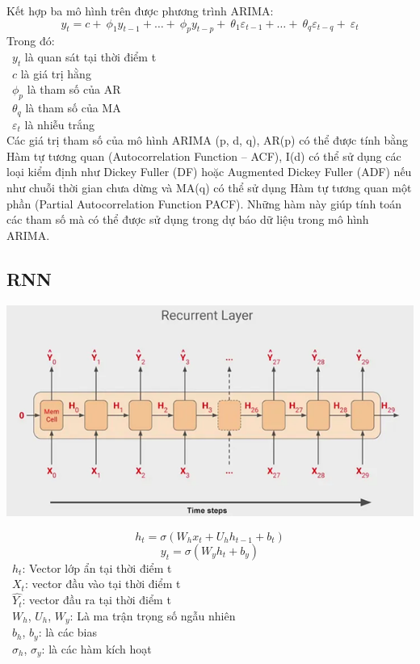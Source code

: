Kết hợp ba mô hình trên được phương trình ARIMA:
\[y_{t} = c + \ \phi_{1}y_{t - 1} + \ldots + \ \phi_{p}y_{t - p} + \ \theta_{1}\varepsilon_{t - 1} + \ldots + \ \theta_{q}\varepsilon_{t - q} + \ \varepsilon_{t}\]
Trong đó:\\
    \indent\textbullet\ \(y_{t}\) là quan sát tại thời điểm t\\
    \indent\textbullet\ \(c\) là giá trị hằng\\
    \indent\textbullet\ \(\phi_{p}\) là tham số của AR\\
    \indent\textbullet\ \(\theta_{q}\) là tham số của MA\\
    \indent\textbullet\ \(\varepsilon_{t}\) là nhiễu trắng\\

Các giá trị tham số của mô hình ARIMA (p, d, q), AR(p) có thể được tính bằng Hàm tự tương quan (Autocorrelation Function – ACF), I(d) có thể sử dụng các loại kiểm định như Dickey Fuller (DF) hoặc Augmented Dickey Fuller (ADF) nếu như chuỗi thời gian chưa dừng và MA(q) có thể sử dụng Hàm tự tương quan một phần (Partial Autocorrelation Function PACF). Những hàm này giúp tính toán các tham số mà có thể được sử dụng trong dự báo dữ liệu trong mô hình ARIMA.

\subsection{RNN}
\begin{minipage}{0.45\textwidth}
\centering
\includegraphics[width=1\textwidth]{resources/chapter-4/rnn-1.png}
\end{minipage}
\[h_t = \sigma (W_{h}x_{t} + U_h h_{t-1} + b_t) \]
\[y_t = \sigma (W_{y} h_t + b_y)\]
    \indent\textbullet\ \(h_t\): Vector lớp ẩn tại thời điểm t\\
    \indent\textbullet\ \(X_t\): vector đầu vào tại thời điểm t\\
    \indent\textbullet\ \(\widehat{Y_t}\): vector đầu ra tại thời điểm t\\
    \indent\textbullet\ \(W_h\), \(U_h\), \(W_y\): Là ma trận trọng số ngẫu nhiên\\
    \indent\textbullet\ \(b_h\), \(b_y\): là các bias\\
    \indent\textbullet\ \(\sigma_h\), \(\sigma_y\): là các hàm kích hoạt\\

